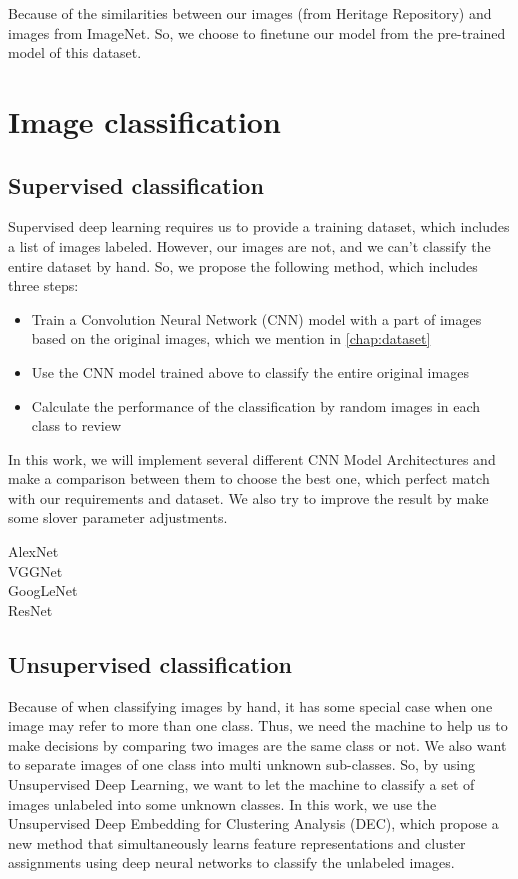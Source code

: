 \documentclass[hidelinks,12pt,a4paper]{report}
\begin{document}
Because of the similarities between our images (from Heritage Repository) and images from ImageNet. So, we choose to finetune our model from the pre-trained model of this dataset.

\section{Image classification}
\subsection{Supervised classification}
Supervised deep learning requires us to provide a training dataset, which includes a list of images labeled. However, our images are not, and we can't classify the entire dataset by hand. So, we propose the following method, which includes three steps:
\begin{itemize}
\item Train a Convolution Neural Network (CNN) model with a part of images based on the original images, which we mention in \autoref{chap:dataset}
\item Use the CNN model trained above to classify the entire original images
\item Calculate the performance of the classification by random images in each class to review
\end{itemize}
In this work, we will implement several different CNN Model Architectures and make a comparison between them to choose the best one, which perfect match with our requirements and dataset. We also try to improve the result by make some slover parameter adjustments.

\begin{description}
\item[AlexNet]
\item[VGGNet]
\item[GoogLeNet]
\item[ResNet]
\end{description}

\subsection{Unsupervised classification}
Because of when classifying images by hand, it has some special case when one image may refer to more than one class. Thus, we need the machine to help us to make decisions by comparing two images are the same class or not. We also want to separate images of one class into multi unknown sub-classes. So, by using Unsupervised Deep Learning, we want to let the machine to classify a set of images unlabeled into some unknown classes. \newline\newline
In this work, we use the Unsupervised Deep Embedding for Clustering Analysis (DEC)\cite{DBLP:journals/corr/XieGF15}, which propose a new method that simultaneously learns feature representations and cluster assignments using deep neural networks to classify the unlabeled images.
\end{document}
